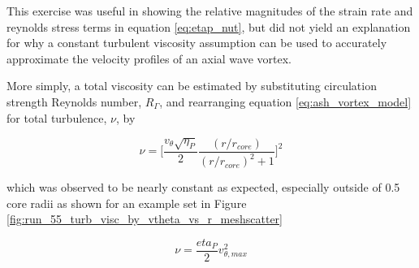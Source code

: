 

This exercise was useful in showing the relative magnitudes of the strain rate 
and reynolds stress terms in equation \ref{eq:etap_nut}, but did not yield an 
explanation for why a constant turbulent viscosity assumption can be used to 
accurately approximate the velocity profiles of an axial wave vortex.

More simply, a total viscosity can be estimated by 
substituting circulation strength Reynolds number, $R_\Gamma$, and rearranging 
equation \ref{eq:ash_vortex_model} for total turbulence, $\nu$, by

\begin{equation}
\nu = \Bigg[\frac{v_\theta \sqrt{\eta_P}}{2}
\frac{(r/r_{core})}{(r/r_{core})^2 + 1}\Bigg]^2
\end{equation}

\noindent
which was observed to be nearly constant as expected, especially outside of 0.5 
core radii as shown for an example set in Figure 
\ref{fig:run_55_turb_visc_by_vtheta_vs_r_meshscatter}


\begin{equation}
\nu = \frac{eta_P}{2} v_{\theta, max}^2
\end{equation}
